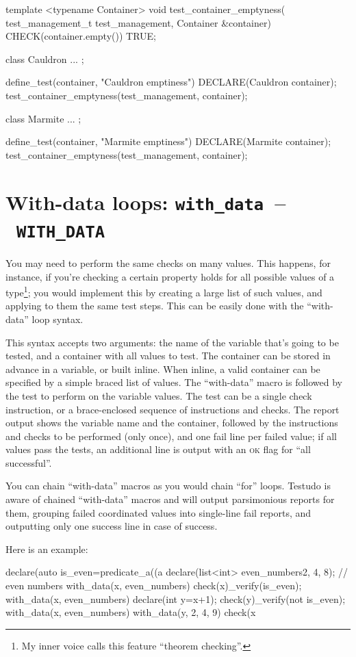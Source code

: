 \documentclass[twoside, a4paper, article]{memoir}
\newcommand*\testudocolor{\color{red!80!blue}}
\newcommand*\testudo[1]{\texttt{\testudocolor{}#1}}
\newcommand*\testudopair[2]{\testudo{#1}~--~\testudo{#2}}
\newcommand\chaptertestudopair[3]{%
  \chapter[#1]{#1: \testudopair{#2}{#3}}}
\begin{document}
\begin{cpplisting}
template <typename Container>
void test_container_emptyness(
    test_management_t test_management,
    Container &container)
{
  CHECK(container.empty()) TRUE;
}

class Cauldron { ... };

define_test(container, "Cauldron emptiness")
{
  DECLARE(Cauldron container);
  test_container_emptyness(test_management, container);
}

class Marmite { ... };

define_test(container, "Marmite emptiness")
{
  DECLARE(Marmite container);
  test_container_emptyness(test_management, container);
}
\end{cpplisting}


\chaptertestudopair{With-data loops}{with\_data}{WITH\_DATA}
\label{cha:with-data-loops}

You may need to perform the same checks on many values.  This happens, for
instance, if you're checking a certain property holds for all possible values
of a type\footnote{My inner voice calls this feature ``theorem checking''.};
you would implement this by creating a large list of such values, and applying
to them the same test steps.  This can be easily done with the ``with-data''
loop syntax.

This syntax accepts two arguments: the name of the variable that's going to be
tested, and a container with all values to test.  The container can be stored
in advance in a variable, or built inline.  When inline, a valid container can
be specified by a simple braced list of values.  The ``with-data'' macro is
followed by the test to perform on the variable values.  The test can be a
single check instruction, or a brace-enclosed sequence of instructions and
checks.  The report output shows the variable name and the container, followed
by the instructions and checks to be performed (only once), and one fail line
per failed value; if all values pass the tests, an additional line is output
with an \textsc{ok} flag for ``all successful''.

You can chain ``with-data'' macros as you would chain ``for'' loops.  Testudo
is aware of chained ``with-data'' macros and will output parsimonious reports
for them, grouping failed coordinated values into single-line fail reports, and
outputting only one success line in case of success.

Here is an example:
\begin{cpplisting}
declare(auto is_even=predicate_a((a%
declare(list<int> even_numbers{2, 4, 8}); // even numbers
with_data(x, even_numbers)
  check(x)_verify(is_even);
with_data(x, even_numbers) {
  declare(int y=x+1);
  check(y)_verify(not is_even);
}
with_data(x, even_numbers)
  with_data(y, {2, 4, 9})
    check(x%
\end{cpplisting}
\end{document}
